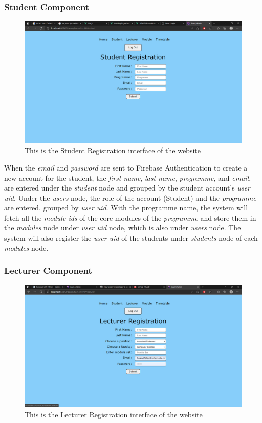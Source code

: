\documentclass[../report.tex]{subfiles}
\begin{document}
\subsubsection{Student Component}
\begin{figure}[H]
	\centering
	\includegraphics[width=.7\linewidth]{../images/07/01-03-student-reg.png}
	\caption{This is the Student Registration interface of the website}
	\label{fig:07-01-03-student}
\end{figure}



When the \textit{email} and \textit{password} are sent to Firebase Authentication to create a new account for the student, the \textit{first name}, \textit{last name}, \textit{programme}, and \textit{email}, are entered under the \textit{student} node and grouped by the student account’s \textit{user uid}. Under the \textit{users} node, the role of the account (Student) and the \textit{programme} are entered, grouped by \textit{user uid}. With the programme name, the system will fetch all the \textit{module ids} of the core modules of the \textit{programme} and store them in the \textit{modules} node under \textit{user uid} node, which is also under \textit{users} node. The system will also register the \textit{user uid} of the students under \textit{students} node of each \textit{modules} node.

\medskip
\subsubsection{Lecturer Component}
\begin{figure}[H]
	\centering
	\includegraphics[width=.7\linewidth]{../images/07/01-04-lecturer-reg.png}
	\caption{This is the Lecturer Registration interface of the website}
	\label{fig:07-01-04-lecturer}
\end{figure}
\end{document}
